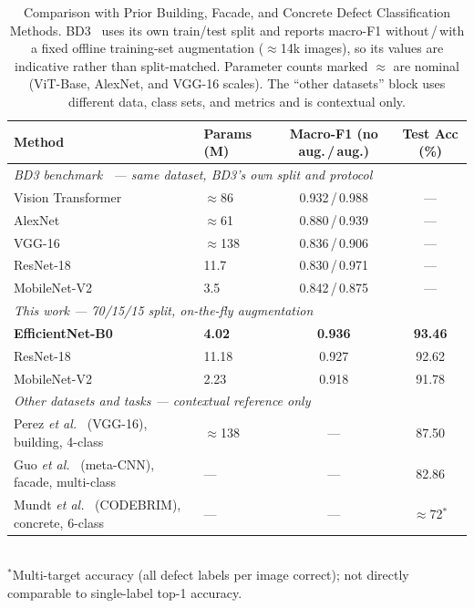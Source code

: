 \documentclass[conference]{IEEEtran}
\begin{document}
\begin{table}[t]
\caption{Comparison with Prior Building, Facade, and Concrete Defect Classification Methods. BD3~\cite{ref40} uses its own train/test split and reports macro-F1 without\,/\,with a fixed offline training-set augmentation ($\approx$14k images), so its values are indicative rather than split-matched. Parameter counts marked $\approx$ are nominal (ViT-Base, AlexNet, and VGG-16 scales). The ``other datasets'' block uses different data, class sets, and metrics and is contextual only.}
\label{tab:comparison}
\centering
\begin{tabular}{llcc}
\toprule
\textbf{Method} & \textbf{Params (M)} & \textbf{Macro-F1 (no aug.\,/\,aug.)} & \textbf{Test Acc (\%)} \\
\midrule
\multicolumn{4}{l}{\textit{BD3 benchmark~\cite{ref40} --- same dataset, BD3's own split and protocol}}\\
Vision Transformer~\cite{ref40} & $\approx$86  & 0.932\,/\,0.988 & --- \\
AlexNet~\cite{ref40}            & $\approx$61  & 0.880\,/\,0.939 & --- \\
VGG-16~\cite{ref40}             & $\approx$138 & 0.836\,/\,0.906 & --- \\
ResNet-18~\cite{ref40}          & 11.7         & 0.830\,/\,0.971 & --- \\
MobileNet-V2~\cite{ref40}       & 3.5          & 0.842\,/\,0.875 & --- \\
\midrule
\multicolumn{4}{l}{\textit{This work --- 70/15/15 split, on-the-fly augmentation}}\\
\textbf{EfficientNet-B0}        & \textbf{4.02}  & \textbf{0.936} & \textbf{93.46} \\
ResNet-18                       & 11.18          & 0.927 & 92.62 \\
MobileNet-V2                    & 2.23           & 0.918 & 91.78 \\
\midrule
\multicolumn{4}{l}{\textit{Other datasets and tasks --- contextual reference only}}\\
Perez \textit{et al.}~\cite{ref9} (VGG-16), building, 4-class  & $\approx$138 & --- & 87.50 \\
Guo \textit{et al.}~\cite{ref10} (meta-CNN), facade, multi-class & ---        & --- & 82.86 \\
Mundt \textit{et al.}~\cite{ref11} (CODEBRIM), concrete, 6-class & ---        & --- & $\approx$72$^{*}$ \\
\bottomrule
\end{tabular}
\\[2pt]
{\footnotesize $^{*}$Multi-target accuracy (all defect labels per image correct); not directly comparable to single-label top-1 accuracy.}
\end{table}
\end{document}
